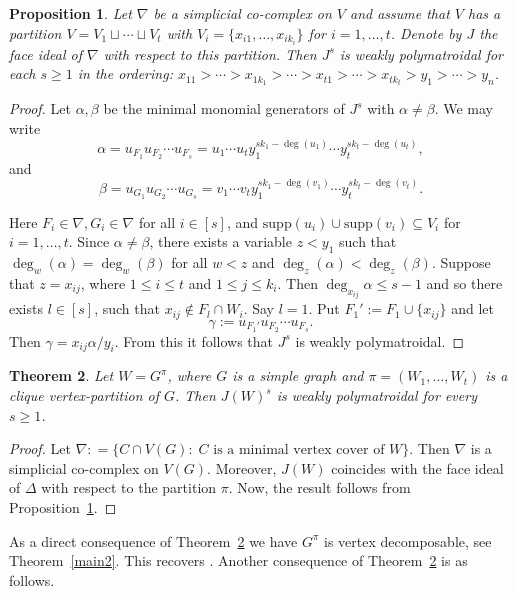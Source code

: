 \documentclass[12pt]{amsart}
\let\:=\colon
\newtheorem{Theorem}{Theorem}[section]
\newtheorem{Proposition}[Theorem]{Proposition}
\begin{document}
\begin{Proposition}\label{w1} Let $\nabla$ be  a simplicial co-complex on $V$ and assume   that $V$ has a partition $V=V_1\sqcup \cdots\sqcup V_t$ with $V_i=\{x_{i1},\ldots,x_{ik_i}\}$ for $i=1,\ldots, t$. Denote by $J$ the face ideal of $\nabla$ with respect to this partition.  Then $J^s$ is weakly polymatroidal for each $s\geq 1$ in the  ordering: $x_{11}>\cdots>x_{1k_1}>\cdots>x_{t1}>\cdots>x_{tk_t}>y_1>\cdots>y_n$.  \end{Proposition}

\begin{proof} Let $\alpha,\beta$ be the minimal monomial generators of $J^s$ with $\alpha\neq \beta$. We may write $$\alpha=u_{F_1}u_{F_2}\cdots u_{F_s}=u_1\cdots u_ty_1^{sk_1-\deg(u_1)}\cdots y_t^{sk_t-\deg(u_t)},$$ and $$\beta=u_{G_1}u_{G_2}\cdots u_{G_s}=v_1\cdots v_ty_1^{sk_1-\deg(v_1)}\cdots y_t^{sk_t-\deg(v_t)}.$$

Here $F_i\in \nabla, G_i\in \nabla$ for all $i\in [s]$, and $\mathrm{supp}(u_i)\cup \mathrm{supp}(v_i)\subseteq V_i$ for $i=1,\ldots,t$. Since $\alpha\neq \beta$, there exists a variable $z<y_1$ such that $\deg_{w}(\alpha)=\deg_{w}(\beta)$ for all $w<z$ and $\deg_{z}(\alpha)<\deg_{z}(\beta)$. Suppose that $z=x_{ij}$, where $1\leq i\leq t$ and $1\leq j\leq k_i$. Then $\deg_{x_{ij}}\alpha\leq s-1$  and so there exists $l\in [s]$,  such that $x_{ij}\notin F_l\cap W_i$. Say $l=1$. Put $F_1':=F_1\cup \{x_{ij}\}$ and let $$\gamma:=u_{F_1'}u_{F_2}\cdots u_{F_s}.$$
Then $\gamma=x_{ij}\alpha/ y_i$.  From this it follows that $J^s$  is weakly polymatroidal.\end{proof}





\begin{Theorem} \label{main3} Let $W=G^{\pi}$,  where $G$ is a simple graph and $\pi=(W_1,\ldots,W_t)$ is a clique vertex-partition of $G$. Then $J(W)^{s}$ is weakly polymatroidal for every $s\geq 1$.
\end{Theorem}

\begin{proof}  Let $\nabla:
=\{C\cap V(G)\:\;  C\mbox{ is a minimal vertex cover of } W\}.$  Then $\nabla$ is a simplicial co-complex on $V(G)$. Moreover, $J(W)$ coincides with the face ideal of $\Delta$ with respect to the partition $\pi$. Now, the result follows from Proposition~\ref{w1}.
\end{proof}


 As a direct consequence of Theorem~\ref{main3}  we have $G^\pi$ is vertex decomposable, see Theorem~\ref{main2}.   This recovers \cite[Theorem 3.3]{CN}.  Another consequence of Theorem~\ref{main3} is as follows.
\end{document}
